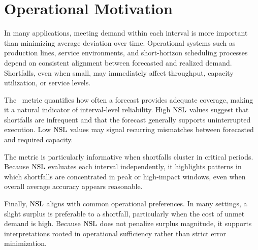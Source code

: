 \section{Operational Motivation}

In many applications, meeting demand within each interval is more important than
minimizing average deviation over time. Operational systems such as production
lines, service environments, and short-horizon scheduling processes depend on
consistent alignment between forecasted and realized demand. Shortfalls, even when
small, may immediately affect throughput, capacity utilization, or service levels.

The \NSL\ metric quantifies how often a forecast provides adequate coverage, making
it a natural indicator of interval-level reliability. High $\text{NSL}$ values suggest
that shortfalls are infrequent and that the forecast generally supports
uninterrupted execution. Low $\text{NSL}$ values may signal recurring mismatches between
forecasted and required capacity.

The metric is particularly informative when shortfalls cluster in critical
periods. Because $\text{NSL}$ evaluates each interval independently, it highlights
patterns in which shortfalls are concentrated in peak or high-impact windows, even
when overall average accuracy appears reasonable.

Finally, $\text{NSL}$ aligns with common operational preferences. In many settings, a
slight surplus is preferable to a shortfall, particularly when the cost of unmet
demand is high. Because $\text{NSL}$ does not penalize surplus magnitude, it supports
interpretations rooted in operational sufficiency rather than strict error
minimization.
